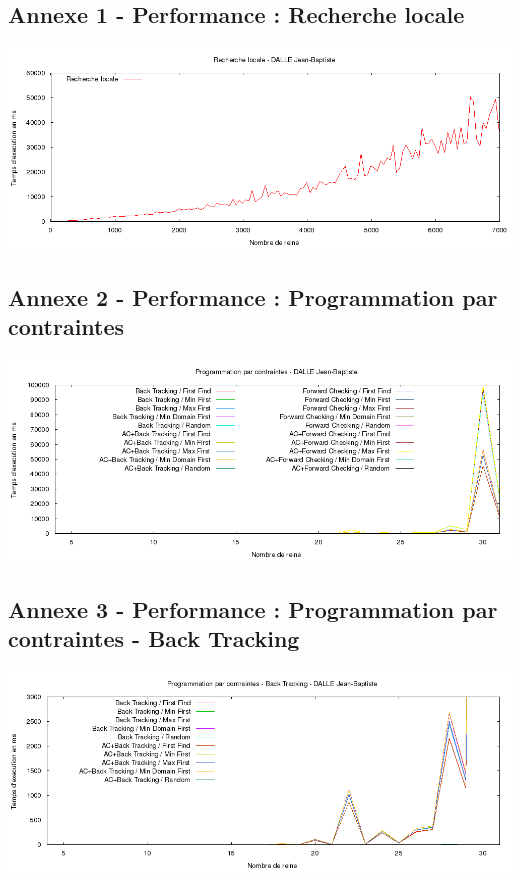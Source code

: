 \documentclass[a4paper,10pt]{article}
\begin{document}
\subsection{Annexe 1 - Performance : Recherche locale}
\includegraphics[width=1\textwidth]{Recherche_Locale.png}

\subsection{Annexe 2 - Performance : Programmation par contraintes}
\includegraphics[width=1\textwidth]{Programmation_par_contraintes.png}

\subsection{Annexe 3 - Performance : Programmation par contraintes - Back Tracking}
\includegraphics[width=1\textwidth]{Programmation_par_contraintes_-_Back_Tracking.png}
\end{document}
